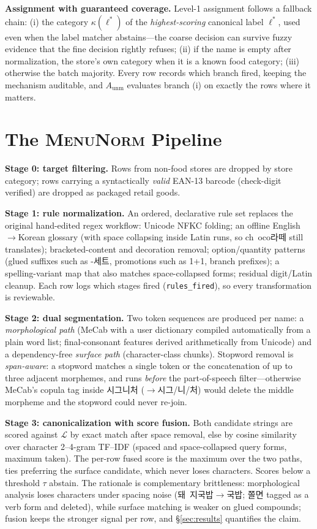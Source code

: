 \documentclass[10pt,twocolumn]{article}
\newcommand{\menunorm}{\textsc{MenuNorm}}
\begin{document}
\textbf{Assignment with guaranteed coverage.} Level-1 assignment follows a
fallback chain: (i) the category $\kappa(\ell^{*})$ of the
\emph{highest-scoring} canonical label $\ell^{*}$, used even when the label
matcher abstains---the coarse decision can survive fuzzy evidence that the
fine decision rightly refuses; (ii) if the name is empty after
normalization, the store's own category when it is a known food category;
(iii) otherwise the batch majority. Every row records which branch fired,
keeping the mechanism auditable, and $A_{\text{unm}}$ evaluates branch (i)
on exactly the rows where it matters.

\section{The \menunorm{} Pipeline}
\label{sec:pipeline}

\textbf{Stage 0: target filtering.} Rows from non-food stores are dropped by
store category; rows carrying a syntactically \emph{valid} EAN-13 barcode
(check-digit verified) are dropped as packaged retail goods.

\textbf{Stage 1: rule normalization.} An ordered, declarative rule set
replaces the original hand-edited regex workflow: Unicode NFKC folding; an
offline English$\rightarrow$Korean glossary (with space collapsing inside
Latin runs, so \mbox{ch oco라떼} still translates); bracketed-content and
decoration removal; option/quantity patterns (glued suffixes such as
\mbox{-세트}, promotions such as \mbox{1+1}, branch prefixes); a
spelling-variant map that also matches space-collapsed forms; residual
digit/Latin cleanup. Each row logs which stages fired
(\texttt{rules\_fired}), so every transformation is reviewable.

\textbf{Stage 2: dual segmentation.} Two token sequences are produced per
name: a \emph{morphological path} (MeCab \cite{kudo2004} with a user
dictionary compiled automatically from a plain word list; final-consonant
features derived arithmetically from Unicode) and a dependency-free
\emph{surface path} (character-class chunks). Stopword removal is
\emph{span-aware}: a stopword matches a single token or the concatenation of
up to three adjacent morphemes, and runs \emph{before} the part-of-speech
filter---otherwise MeCab's copula tag inside 시그니처
($\rightarrow$시그/니/처) would delete the middle morpheme and the stopword
could never re-join.

\textbf{Stage 3: canonicalization with score fusion.} Both candidate strings
are scored against $\mathcal{L}$ by exact match after space removal, else by
cosine similarity over character 2--4-gram TF--IDF \cite{cavnar1994}
(spaced and space-collapsed query forms, maximum taken). The per-row fused
score is the maximum over the two paths, ties preferring the surface
candidate, which never loses characters. Scores below a threshold $\tau$
abstain. The rationale is complementary brittleness: morphological analysis
loses characters under spacing noise (\mbox{돼 지국밥}$\rightarrow$국밥;
쫄면 tagged as a verb form and deleted), while surface matching is weaker on
glued compounds; fusion keeps the stronger signal per row, and
\S\ref{sec:results} quantifies the claim.
\end{document}

